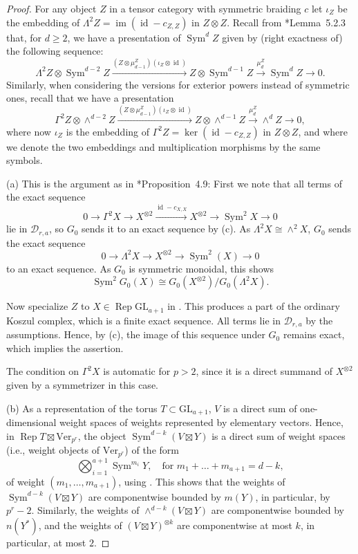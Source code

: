 \documentclass[11pt,oneside]{amsart}
\theoremstyle{definition}
\theoremstyle{remark}
\numberwithin{equation}{section}
\newcommand\cD{\mathcal D}
\newcommand\Ver{\mathrm{Ver}}
\newcommand\GL{\mathrm{GL}}
\newcommand\Rep{\operatorname{Rep}}
\newcommand\im{\operatorname{im}}
\newcommand\Sym{\operatorname{Sym}}
\renewcommand\o\otimes
\renewcommand\:\colon
\newcommand\id{\operatorname{id}}
\begin{document}
\begin{proof} For any object $Z$ in a tensor category with symmetric braiding $c$ let $\iota_Z$ be the embedding of $\Lambda^2 Z=\im(\id-c_{Z,Z})$ in $Z\o Z$.
Recall from \cite{CEN}*{Lemma~5.2.3} that, for $d\ge2$, we have a presentation of $\Sym^d Z$ given by (right exactness of) the following sequence:
\begin{equation}
\Lambda^2 Z\o \Sym^{d-2} Z 
 \xrightarrow{(Z\o\mu^Z_{d-1})(\iota_Z\o\id)}
Z \o \Sym^{d-1} Z
 \xrightarrow{\mu^Z_d}
\Sym^d Z
 \to 0.
\label{eq:presentation}
\end{equation}
Similarly, when considering the versions for exterior powers instead of symmetric ones, recall that we have a presentation
\begin{equation}
\Gamma^2 Z\o \wedge^{d-2} Z 
 \xrightarrow{(Z\o\mu^Z_{d-1})(\iota_Z\o\id)}
Z \o \wedge^{d-1} Z
 \xrightarrow{\mu^Z_d}
\wedge^d Z
 \to 0,
\label{eq:presentation-wedge}
\end{equation}
where now $\iota_Z$ is the embedding of $\Gamma^2Z=\ker(\id-c_{Z,Z})$ in $Z\o Z$, and where we denote the two embeddings and multiplication morphisms by the same symbols.

(a) This is the argument as in \cite{Newton}*{Proposition~4.9}: First we note that all terms of the exact sequence
$$
0 \to \Gamma^2 X \to X^{\o 2} \xrightarrow{\id-c_{X,X}} X^{\o 2} \to \Sym^2 X \to 0
$$
lie in $\cD_{r,a}$, so $G_0$ sends it to an exact sequence by (c). As $\Lambda^2 X\cong \wedge^2 X$, $G_0$ sends the exact sequence
$$
0 \to \Lambda^2 X \to X^{\o 2} \to \Sym^2(X) \to 0
$$
to an exact sequence. As $G_0$ is symmetric monoidal, this shows 
$$
\Sym^2 G_0(X)\cong G_0(X^{\o 2})/G_0(\Lambda^2 X) .
$$  

Now specialize $Z$ to $X\in\Rep\GL_{a+1}$ in . This produces a part of the ordinary Koszul complex, which is a finite exact sequence. All terms lie in $\cD_{r,a}$ by the assumptions. Hence, by (c), the image of this sequence under $G_0$ remains exact, which implies the assertion.

The condition on $\Gamma^2 X$ is automatic for $p>2$, since it is a direct summand of $X^{\o 2}$ given by a symmetrizer in this case.

(b) As a representation of the torus $T\subset \GL_{a+1}$, $V$ is a direct sum of one-dimensional weight spaces of weights  represented by elementary vectors. Hence, in $\Rep T\boxtimes\Ver_{p^r}$, the object $\Sym^{d-k}(V\boxtimes Y)$ is a direct sum of weight spaces (i.e., weight objects of $\Ver_{p^r}$) of the form 
$$
\bigotimes_{i=1}^{a+1} \Sym^{m_i} Y ,\quad
\text{for } m_1+\dots+m_{a+1} = d-k,
$$
of weight $(m_1,\dots,m_{a+1})$, using . This shows that the weights of $\Sym^{d-k}(V\boxtimes Y)$ are componentwise bounded by $m(Y)$, in particular, by $p^r-2$. Similarly, the weights of $\wedge^{d-k}(V\boxtimes Y)$ are componentwise bounded by $n(Y^*)$, and the weights of $(V\boxtimes Y)^{\o k}$ are componentwise at most $k$, in particular, at most $2$.


\end{proof}
\end{document}
